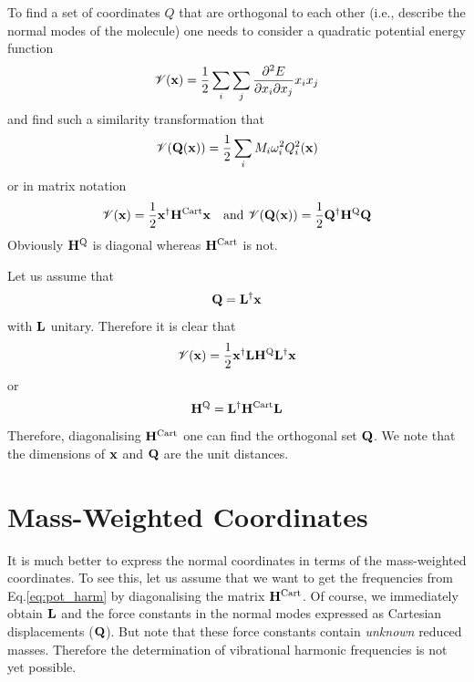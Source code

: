 \documentclass[b5paper,oneside,fleqn,11pt]{book}
\begin{document}
\begin{appendices}
To find a set of coordinates $Q$ that are orthogonal to each other (i.e., describe the normal 
modes of the molecule) one needs to consider a quadratic potential energy function
\begin{equation}
\mathscr{V}({\bf x}) = \frac{1}{2} \sum_i\sum_j \frac{\partial^2 E}{\partial x_i \partial x_j} x_i x_j
\end{equation}
and find such a similarity transformation that
\begin{equation}\label{eq:pot_harm}
\mathscr{V}({\bf Q}({\bf x})) = \frac{1}{2} \sum_i M_i \omega_i^2 Q_i^2({\bf x})
\end{equation}
or in matrix notation
\begin{equation}
\mathscr{V}({\bf x}) = \frac{1}{2} {\bf x}^{\dagger} {\bf H}^{\rm Cart} {\bf x}  
\quad \textrm{and   } \mathscr{V}({\bf Q}({\bf x})) = \frac{1}{2} {\bf Q}^{\dagger} {\bf H}^{\rm Q} {\bf Q} 
\end{equation}
Obviously ${\bf H}^{\rm Q}$ is diagonal whereas ${\bf H}^{\rm Cart}$ is not. 

Let us assume that
\begin{equation}
{\bf Q} = {\bf L}^{\dagger} {\bf x}
\end{equation}
with ${\bf L}$ unitary.
Therefore it is clear that
\begin{equation}
\mathscr{V}({\bf x}) = \frac{1}{2} {\bf x}^{\dagger} {\bf L} {\bf H}^{\rm Q} {\bf L}^{\dagger} {\bf x}
\end{equation}
or
\begin{equation}
{\bf H}^{\rm Q} = {\bf L}^{\dagger} {\bf H}^{\rm Cart} {\bf L}
\end{equation}
Therefore, diagonalising ${\bf H}^{\rm Cart}$ one can find the orthogonal 
set ${\bf Q}$. We note that the dimensions of ${\bf x}$ and ${\bf Q}$ are the unit distances.

\section{Mass-Weighted Coordinates\label{a:mw-coord}}

It is much better to express the normal coordinates in terms of the mass\hyp{}weighted coordinates.
To see this, let us assume that we want to get the frequencies from Eq.\eqref{eq:pot_harm} by diagonalising
the matrix ${\bf H}^{\rm Cart}$. Of course, we immediately obtain ${\bf L}$ and the force constants
in the normal modes expressed as Cartesian displacements (${\bf Q}$). But note that these force constants 
contain \emph{unknown} reduced masses.
Therefore the determination of vibrational harmonic frequencies is not yet possible. 


\end{appendices}
\end{document}
